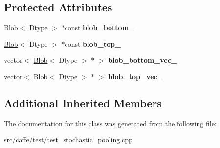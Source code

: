 \subsection*{Protected Attributes}
\begin{DoxyCompactItemize}
\item 
\mbox{\label{classcaffe_1_1_stochastic_pooling_layer_test_a8aa2f9fb3d6e9d6974e6ddffaea63d3b}} 
\mbox{\hyperlink{classcaffe_1_1_blob}{Blob}}$<$ Dtype $>$ $\ast$const {\bfseries blob\+\_\+bottom\+\_\+}
\item 
\mbox{\label{classcaffe_1_1_stochastic_pooling_layer_test_a39be3adffc2011088aeb4c217b33b846}} 
\mbox{\hyperlink{classcaffe_1_1_blob}{Blob}}$<$ Dtype $>$ $\ast$const {\bfseries blob\+\_\+top\+\_\+}
\item 
\mbox{\label{classcaffe_1_1_stochastic_pooling_layer_test_a6e4f42d172493d12e0f1e061340a201c}} 
vector$<$ \mbox{\hyperlink{classcaffe_1_1_blob}{Blob}}$<$ Dtype $>$ $\ast$ $>$ {\bfseries blob\+\_\+bottom\+\_\+vec\+\_\+}
\item 
\mbox{\label{classcaffe_1_1_stochastic_pooling_layer_test_a17744f378baee50a3a85422ff5679e9b}} 
vector$<$ \mbox{\hyperlink{classcaffe_1_1_blob}{Blob}}$<$ Dtype $>$ $\ast$ $>$ {\bfseries blob\+\_\+top\+\_\+vec\+\_\+}
\end{DoxyCompactItemize}
\subsection*{Additional Inherited Members}


The documentation for this class was generated from the following file\+:\begin{DoxyCompactItemize}
\item 
src/caffe/test/test\+\_\+stochastic\+\_\+pooling.\+cpp\end{DoxyCompactItemize}
